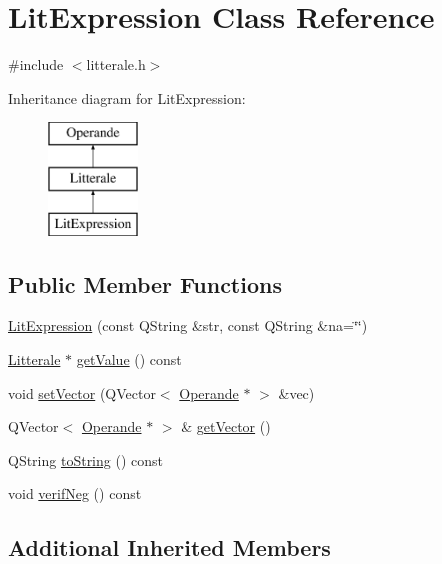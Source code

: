 \hypertarget{class_lit_expression}{}\section{Lit\+Expression Class Reference}
\label{class_lit_expression}


{\ttfamily \#include $<$litterale.\+h$>$}

Inheritance diagram for Lit\+Expression\+:\begin{figure}[H]
\begin{center}
\leavevmode
\includegraphics[height=3.000000cm]{class_lit_expression}
\end{center}
\end{figure}
\subsection*{Public Member Functions}
\begin{DoxyCompactItemize}
\item 
\hyperlink{class_lit_expression_a5d6cb1828c33a9c39684766c21042216}{Lit\+Expression} (const Q\+String \&str, const Q\+String \&na=\char`\"{}\char`\"{})
\item 
\hyperlink{class_litterale}{Litterale} $\ast$ \hyperlink{class_lit_expression_aa4b5ba342bdf239612d733d7f8e5319c}{get\+Value} () const 
\item 
void \hyperlink{class_lit_expression_a60a52c1344ff29fa1576720bc60c0577}{set\+Vector} (Q\+Vector$<$ \hyperlink{class_operande}{Operande} $\ast$ $>$ \&vec)
\item 
Q\+Vector$<$ \hyperlink{class_operande}{Operande} $\ast$ $>$ \& \hyperlink{class_lit_expression_a9ba612027808bbc67d762e7592332d79}{get\+Vector} ()
\item 
Q\+String \hyperlink{class_lit_expression_a108f8809e4ca49343426c9d0c30c28c4}{to\+String} () const 
\item 
void \hyperlink{class_lit_expression_a6673aba807725a2e1820af3bfeb8cf36}{verif\+Neg} () const 
\end{DoxyCompactItemize}
\subsection*{Additional Inherited Members}


